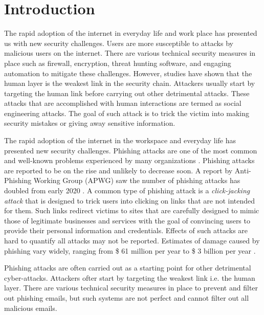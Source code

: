 

\pagestyle{plain} %
\setcounter{page}{1}
\chapter{Introduction}

The rapid adoption of the internet in everyday life and work place has presented us with new security challenges. Users are more susceptible to attacks by malicious users on the internet. There are various technical security measures in place such as firewall, encryption, threat hunting software, and engaging automation to mitigate these challenges. However, studies have shown that the human layer is the weakest link in the security chain\cite{accenture}. Attackers usually start by targeting the human link before carrying out other detrimental attacks. These attacks that are accomplished with  human interactions are termed as social engineering attacks. The goal of such attack is to trick the victim into making security mistakes or giving away sensitive information.


The rapid adoption of the internet in the workspace and everyday life has presented new security challenges. Phishing attacks are one of the most common and well-known problems experienced by many organizations \cite{jampen}.  Phishing attacks are reported to be on the rise and unlikely to decrease soon. A report by Anti-Phishing Working Group (APWG) saw the number of phishing attacks has doubled from early 2020 \cite{APWG}. A common type of phishing attack is a \emph{click-jacking attack} that is designed to trick users into clicking on links that are not intended for them. Such links redirect victims to sites that are carefully designed to mimic those of legitimate businesses and services with the goal of convincing users to provide their personal information and credentials\cite{jampen}. Effects of such attacks are hard to quantify all attacks may not be reported. Estimates of damage caused by phishing vary widely, ranging from \$ 61 million per year to \$ 3 billion per year \cite{hong_2012}.

Phishing attacks are often carried out as a starting point for other detrimental cyber-attacks\cite{jampen}. Attackers ofter start by targeting the weakest link i.e. the human layer\cite{accenture}. There are various technical security measures in place to prevent and filter out phishing emails\cite{hird, dou}, but such systems are not perfect and cannot filter out all malicious emails.


